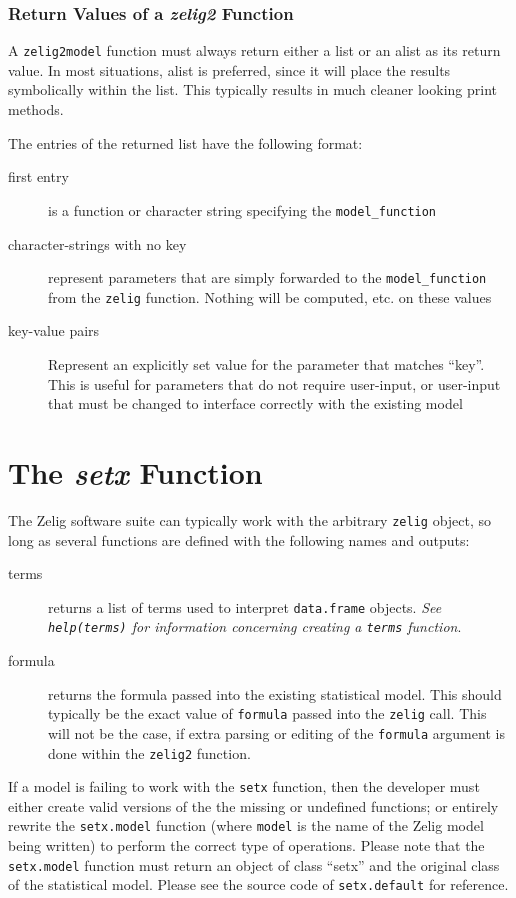 \documentclass[11pt]{article}
\begin{document}
\subsubsection{Return Values of a \emph{zelig2} Function}

A {\tt zelig2model} function must always return either a list or an alist as its return value.  In most situations, alist is preferred, since it will place the results symbolically within the list.  This typically results in much cleaner looking print methods.

The entries of the returned list have the following format:
\begin{description}
	\item[first entry]{is a function or character string specifying the {\tt model\_function}}
	\item[character-strings with no key]{represent parameters that are simply forwarded to the {\tt model\_function} from the {\tt zelig} function.  Nothing will be computed, etc. on these values}
	\item[key-value pairs]{Represent an explicitly set value for the parameter that matches ``key''.  This is useful for parameters that do not require user-input, or user-input that must be changed to interface correctly with the existing model}
\end{description}


%
\section{The \emph{setx} Function}
The Zelig software suite can typically work with the arbitrary {\tt zelig} object, so long as several functions are defined with the following names and outputs:

\begin{description}
	\item[terms]{returns a list of terms used to interpret {\tt data.frame} objects.  \emph{See {\tt help(terms)} for information concerning creating a {\tt terms} function}.}
	\item[formula]{returns the formula passed into the existing statistical model.  This should typically be the exact value of {\tt formula} passed into the {\tt zelig} call.  This will not be the case, if extra parsing or editing of the {\tt formula} argument is done within the {\tt zelig2} function.}
\end{description}

If a model is failing to work with the {\tt setx} function, then the developer must either create valid versions of the the missing or undefined functions; or entirely rewrite the {\tt setx.model} function (where {\tt model} is the name of the Zelig model being written) to perform the correct type of operations.  Please note that the {\tt setx.model} function must return an object of class ``setx'' and the original class of the statistical model.  Please see the source code of {\tt setx.default} for reference.
\end{document}
